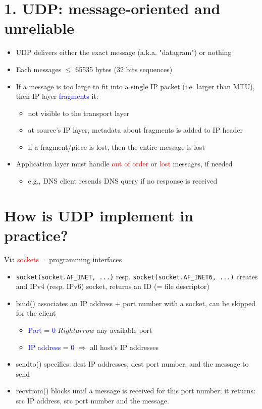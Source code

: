 \documentclass[11pt]{article}
\begin{document}
\section*{1. UDP: message-oriented and unreliable}
\begin{itemize}
	\item UDP delivers either the exact message (a.k.a. "datagram") or nothing
	\item Each messages $\leq$ 65535 bytes (32 bits sequences)
	\item If a message is too large to fit into a single IP packet (i.e. larger than MTU), then IP layer \textcolor{blue}{fragments} it:
		\begin{itemize}
			\item not visible to the transport layer
			\item at source's IP layer, metadata about fragments is added to IP header
			\item if a fragment/piece is lost, then the entire message is lost
		\end{itemize}
	\item Application layer must handle \textcolor{red}{out of order} or \textcolor{red}{lost} messages, if needed
		\begin{itemize}
			\item e.g., DNS client resends DNS query if no response is received
		\end{itemize}
\end{itemize}

\section*{How is UDP implement in practice?}

Via \textcolor{red}{sockets} = programming interfaces
\begin{itemize}
	\begin{itemize}
		\item (in Unix) for read/write: sockets $\approx$ files
	\end{itemize}
 	\item \verb|socket(socket.AF_INET, ...)| resp. \verb|socket(socket.AF_INET6, ...)| creates and IPv4 (resp. IPv6) socket, returns an ID (= file descriptor)
	\item bind() associates an IP address + port number with a socket, can be skipped for the client
		\begin{itemize}
			\item \textcolor{blue}{Port = 0} $Rightarrow$ any available port
			\item  \textcolor{blue}{IP address = 0} $\Rightarrow$ all host's IP addresses
		\end{itemize}
	\item sendto() specifies: dest IP addresses, dest port number, and the message to send
	\item recvfrom() blocks until a message is received for this port number; it returns: src IP address, src port number and the message.
\end{itemize}
\end{document}
